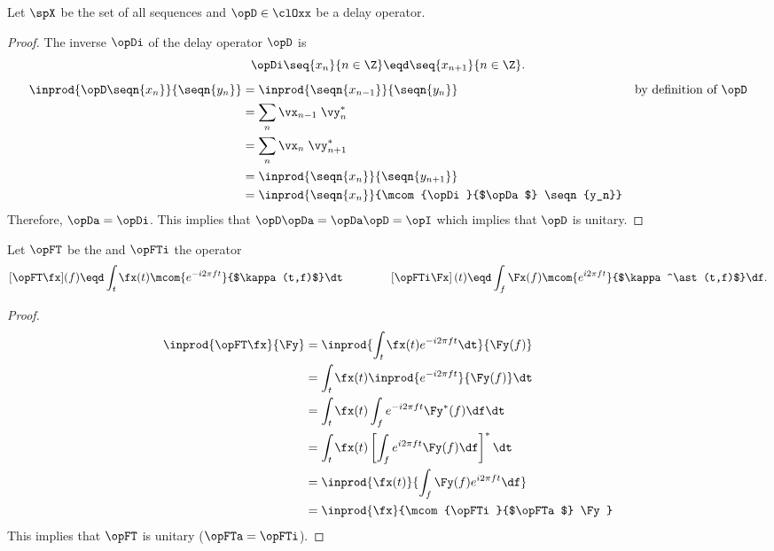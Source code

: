 \begin{example}
Let $\spX$ be the set of all sequences and $\opD\in\clOxx$ be
a delay operator.
\end{example}
\begin{proof}
The inverse $\opDi$ of the delay operator $\opD$ is
  \[\opDi\seq{x_n}{n\in\Z}\eqd\seq{x_{n+1}}{n\in\Z}.\]
\begin{align*}
  \inprod{\opD\seqn{x_n}}{\seqn{y_n}}
    &= \inprod{\seqn{x_{n-1}}}{\seqn{y_n}}
    && \text{by definition of $\opD$}
  \\&= \sum_n\vx_{n-1}\;\vy_n^\ast
  \\&= \sum_n\vx_n\;\vy_{n+1}^\ast
  \\&= \inprod{\seqn{x_n}}{\seqn{y_{n+1}}}
  \\&= \inprod{\seqn{x_n}}{\mcom{\opDi}{$\opDa$} \seqn{y_n}}
\end{align*}
Therefore,
$\opDa=\opDi$. This implies that $\opD\opDa=\opDa\opD=\opI$
which implies that $\opD$ is unitary.
\end{proof}

\begin{example}
\label{ex:operator_opFT_unitary}
Let $\opFT$ be the  and
$\opFTi$ the  operator 
  \[
    [\opFT \fx](f) \eqd \int_t \fx(t) \mcom{e^{-i2\pi ft}}{$\kappa(t,f)$} \dt
    \qquad\qquad
    \left[\opFTi \Fx\right](t) \eqd \int_f \Fx(f) \mcom{e^{i2\pi ft}}{$\kappa^\ast(t,f)$} \df.
  \]
\end{example}
\begin{proof}
  \begin{align*}
    \inprod{\opFT \fx}{\Fy}
      &= \inprod{\int_t \fx(t) e^{-i2\pi ft} \dt }{\Fy(f)}
    \\&= \int_t \fx(t) \inprod{e^{-i2\pi ft} }{\Fy(f)} \dt
    \\&= \int_t \fx(t) \int_f e^{-i2\pi ft} \Fy^\ast(f) \df \dt
    \\&= \int_t \fx(t) \left[\int_f e^{i2\pi ft} \Fy(f) \df \right]^\ast \dt
    \\&= \inprod{\fx(t)}{\int_f \Fy(f) e^{i2\pi ft} \df }
    \\&= \inprod{\fx}{\mcom{\opFTi}{$\opFTa$} \Fy}
  \end{align*}
This implies that $\opFT$ is unitary ($\opFTa = \opFTi$).
\end{proof}

